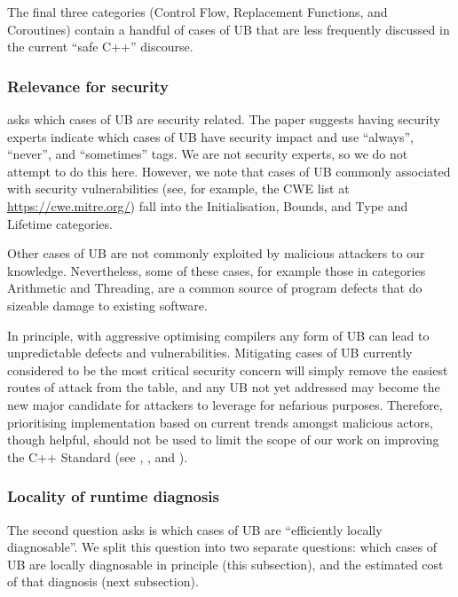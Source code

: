 The final three categories (Control Flow, Replacement Functions, and Coroutines) contain a handful of cases of UB that are less frequently discussed in the current ``safe C++'' discourse.

\subsubsection{Relevance for security}

\cite{P3656R1} asks which cases of UB are security related. The paper suggests having security experts indicate which cases of UB have security impact and use ``always'', ``never'', and ``sometimes'' tags. We are not security experts, so we do not attempt to do this here. However, we note that cases of UB commonly associated with security vulnerabilities (see, for example, the CWE list at \url{https://cwe.mitre.org/}) fall into the Initialisation, Bounds, and Type and Lifetime categories. 

Other cases of UB are not commonly exploited by malicious attackers to our knowledge. Nevertheless, some of these cases, for example those in categories Arithmetic and Threading, are a common source of program defects that do sizeable damage to existing software.

In principle, with aggressive optimising compilers any form of UB can lead to unpredictable defects and vulnerabilities. Mitigating cases of UB currently considered to be the most critical security concern will simply remove the easiest routes of attack from the table, and any UB not yet addressed may become the new major candidate for attackers to leverage for nefarious purposes.  Therefore, prioritising implementation based on current trends amongst malicious actors, though helpful, should not be used to limit the scope of our work on improving the C++ Standard (see \cite{Sutter2024}, \cite{P3500R1}, and \cite{P3578R0}).

\subsubsection{Locality of runtime diagnosis}
\label{locally}

The second question \cite{P3656R1} asks is which cases of UB are ``efficiently locally diagnosable''. We split this question into two separate questions: which cases of UB are locally diagnosable in principle (this subsection), and the estimated cost of that diagnosis (next subsection).

